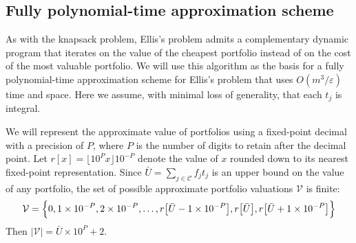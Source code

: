 \documentclass[12pt]{article} %
\newcommand{\lIfElse}[3]{\lIf{#1}{#2 \textbf{else}~#3}}
\newtheorem{theorem}{Theorem}
\theoremstyle{definition}
\newtheorem{theorem}{정리}
\theoremstyle{definition}
\begin{document}
%
%


\subsection{Fully polynomial-time approximation scheme}
As with the knapsack problem, Ellis's problem admits a complementary dynamic program that iterates on the value of the cheapest portfolio instead of on the cost of the most valuable portfolio. We will use this algorithm as the basis for a fully polynomial-time approximation scheme for Ellis's problem that uses $O(m^3 / \varepsilon)$ time and space. Here we assume, with minimal loss of generality, that each $t_j$ is integral.

We will represent the approximate value of portfolios using a fixed-point decimal with a precision of $P$, where $P$ is the number of digits to retain after the decimal point. Let $r[x] = \lfloor 10^P x \rfloor 10^{-P}$ denote the value of $x$ rounded down to its nearest fixed-point representation. Since $\bar U = \sum_{j\in \mathcal{C}} f_j t_j$ is an upper bound on the value of any portfolio, the set of possible approximate portfolio valuations $\mathcal{V}$ is finite:
\begin{equation}
\mathcal{V} = \Bigl\{0, 1\times 10^{-P}, 2\times 10^{-P}, \dots, r\bigl[\bar U- 1\times 10^{-P}\bigr], r\bigl[\bar U\bigr], r\bigl[\bar U+ 1\times 10^{-P}\bigr]\Bigr\}
\end{equation}
Then $|\mathcal{V} | = \bar U \times 10^P + 2$.
\end{document}
